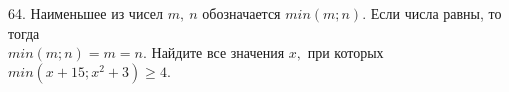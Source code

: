 64. Наименьшее из чисел $m,\ n$ обозначается $min(m;n).$ Если числа равны, то тогда\\
$min(m;n)=m=n.$ Найдите все значения $x,$ при которых $min(x+15;x^2+3)\geqslant 4.$\\
